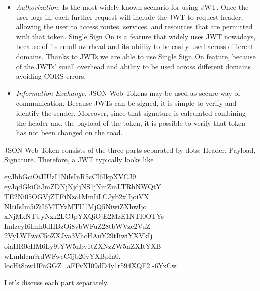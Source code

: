 \begin{itemize}
    \item \textit{Authorization.} Is the most widely known scenario for using JWT\@.
    Once the user logs in, each further request will include the JWT to request header, allowing the user to access routes,
    services, and resources that are permitted with that token.
    Single Sign On is a feature that widely uses JWT nowadays, because of its small overhead and its ability to be easily
    used across different domains.
    Thanks to JWTs we are able to use Single Sign On feature, because of the JWTs' small overhead and ability to be
    used across different domains avoiding CORS errors.
    \item \textit{Information Exchange.} JSON Web Tokens may be used as secure way of communication.
    Because JWTs can be signed, it is simple to verify and identify the sender.
    Moreover, since that signature is calculated combining the header and the payload of the token, it is possible to verify
    that token has not been changed on the road.
\end{itemize}
JSON Web Token consists of the three parts separated by dots: Header, Payload, Signature.
Therefore, a JWT typically looks like
\begin{center}
    \begin{spverbatim}
        eyJhbGciOiJIUzI1NiIsInR5cCI6IkpXVCJ9.
        eyJqdGkiOiJmZDNjNjdjNS1jNmZmLTRhNWQtY
        TE2Ni05OGVjZTFiNzc1MmIiLCJyb2xlIjoiVX
        NlciIsIm5iZiI6MTYzMTU1MjQ5NiwiZXhwIjo
        xNjMxNTUyNzk2LCJpYXQiOjE2MzE1NTI0OTYs
        ImlzcyI6Imh0dHBzOi8vbWFuZ28tbWVzc2VuZ
        2VyLWFwcC5oZXJva3VhcHAuY29tIiwiYXVkIj
        oiaHR0cHM6Ly9tYW5nby1tZXNzZW5nZXItYXB
        wLmhlcm9rdWFwcC5jb20vYXBpIn0.
        locHt8ow1lFnGGZ_aFFvXI09dD4y1r594XQF2
        -6YxCw
    \end{spverbatim}
\end{center}
Let's discuss each part separately.
